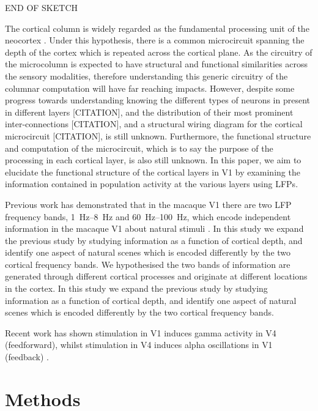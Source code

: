 END OF SKETCH

The cortical column is widely regarded as the fundamental processing unit of the neocortex \citep{Mountcastle1957}.
Under this hypothesis, there is a common microcircuit spanning the depth of the cortex which is repeated across the cortical plane.
As the circuitry of the microcolumn is expected to have structural and functional similarities across the sensory modalities, therefore understanding this generic circuitry of the columnar computation will have far reaching impacts.
However, despite some progress towards understanding knowing the different types of neurons in present in different layers [CITATION], and the distribution of their most prominent inter-connections [CITATION], and a structural wiring diagram for the cortical microcircuit [CITATION], is still unknown.
Furthermore, the functional structure and computation of the microcircuit, which is to say the purpose of the processing in each cortical layer, is also still unknown.
In this paper, we aim to elucidate the functional structure of the cortical layers in \ac{V1} by examining the information contained in population activity at the various layers using \acp{LFP}.


Previous work has demonstrated that in the macaque \ac{V1} there are two \ac{LFP} frequency bands, \SIrange{1}{8}{Hz} and \SIrange{60}{100}{Hz}, which encode independent information in the macaque \ac{V1} about natural stimuli \citep{Belitski2008}.
In this study we expand the previous study by studying information as a function of cortical depth, and identify one aspect of natural scenes which is encoded differently by the two cortical frequency bands.
We hypothesised the two bands of information are generated through different cortical processes and originate at different locations in the cortex.
In this study we expand the previous study by studying information as a function of cortical depth, and identify one aspect of natural scenes which is encoded differently by the two cortical frequency bands.

Recent work has shown stimulation in \ac{V1} induces gamma activity in \ac{V4} (feedforward), whilst stimulation in \ac{V4} induces alpha oscillations in \ac{V1} (feedback) \citep{VanKerkoerle2014}.


\section{Methods}
\label{sec:lam_exp}

